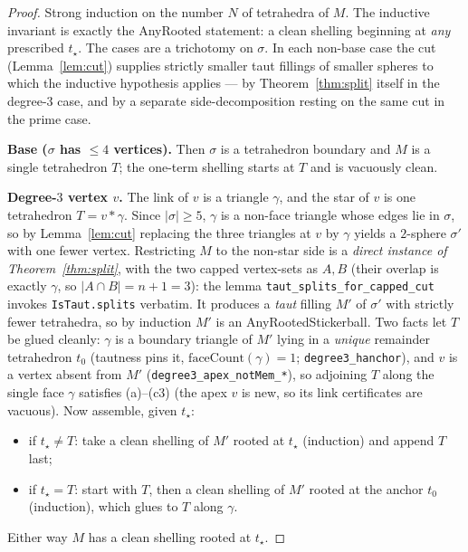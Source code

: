 \documentclass[11pt]{article}
\theoremstyle{plain}
\theoremstyle{definition}
\theoremstyle{remark}
\newcommand{\code}[1]{\texttt{#1}}
\newcommand{\card}[1]{\lvert #1\rvert}
\begin{document}
\begin{proof}
Strong induction on the number $N$ of tetrahedra of $M$. The inductive invariant is exactly
the AnyRooted statement: a clean shelling beginning at \emph{any} prescribed $t_\star$. The
cases are a trichotomy on $\sigma$. In each non-base case the cut (Lemma~\ref{lem:cut})
supplies strictly smaller taut fillings of smaller spheres to which the inductive hypothesis
applies --- by Theorem~\ref{thm:split} itself in the degree-$3$ case, and by a separate
side-decomposition resting on the same cut in the prime case.

\medskip
\noindent\textbf{Base ($\sigma$ has $\le 4$ vertices).} Then $\sigma$ is a tetrahedron
boundary and $M$ is a single tetrahedron $T$; the one-term shelling starts at $T$ and is
vacuously clean.

\medskip
\noindent\textbf{Degree-$3$ vertex $v$.} The link of $v$ is a triangle $\gamma$, and the
star of $v$ is one tetrahedron $T=v\ast\gamma$. Since $\card{\sigma}\ge 5$, $\gamma$ is a
non-face triangle whose edges lie in $\sigma$, so by Lemma~\ref{lem:cut} replacing the three
triangles at $v$ by $\gamma$ yields a $2$-sphere $\sigma'$ with one fewer vertex. Restricting
$M$ to the non-star side is a \emph{direct instance of Theorem~\ref{thm:split}}, with the two
capped vertex-sets as $A,B$ (their overlap is exactly $\gamma$, so $\card{A\cap B}=n{+}1=3$):
the lemma \code{taut\_splits\_for\_capped\_cut} invokes \code{IsTaut.splits} verbatim. It
produces a \emph{taut} filling $M'$ of $\sigma'$ with strictly fewer tetrahedra, so by
induction $M'$ is an AnyRootedStickerball. Two facts let $T$ be glued cleanly: $\gamma$ is a boundary
triangle of $M'$ lying in a \emph{unique} remainder tetrahedron $t_0$ (tautness pins it,
$\text{faceCount}(\gamma)=1$; \code{degree3\_hanchor}), and $v$ is a vertex absent from $M'$
(\code{degree3\_apex\_notMem\_*}), so adjoining $T$ along the single face $\gamma$ satisfies
(a)--(c3) (the apex $v$ is new, so its link certificates are vacuous). Now assemble, given
$t_\star$:
\begin{itemize}
\item if $t_\star\neq T$: take a clean shelling of $M'$ rooted at $t_\star$ (induction) and
append $T$ last;
\item if $t_\star=T$: start with $T$, then a clean shelling of $M'$ rooted at the anchor
$t_0$ (induction), which glues to $T$ along $\gamma$.
\end{itemize}
Either way $M$ has a clean shelling rooted at $t_\star$.


\end{proof}
\end{document}
